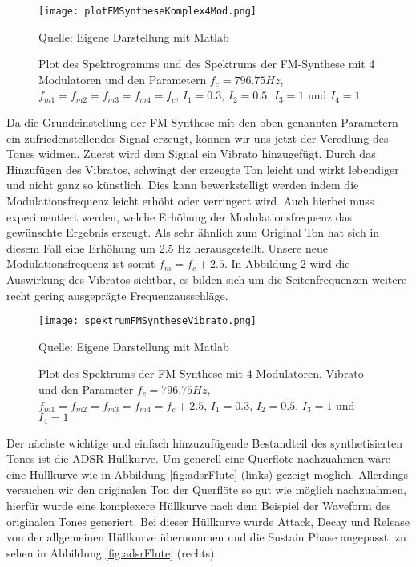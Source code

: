 \begin{figure} [ht]
\centering
  \texttt{[image: plotFMSyntheseKomplex4Mod.png]}
\caption{Plot des Spektrogramms und des Spektrums der FM-Synthese mit 4 Modulatoren und den Parametern $f_c = 796.75 Hz$, $f_{m1} = f_{m2} = f_{m3} = f_{m4} = f_c$, $I_1 = 0.3$, $I_2 = 0.5$, $I_3 = 1$ und $I_4 = 1$}
\label{fig:plotFMSyntheseKomplex4Mod}
Quelle: Eigene Darstellung mit Matlab
\end{figure}

Da die Grundeinstellung der FM-Synthese mit den oben genannten Parametern ein zufriedenstellendes Signal erzeugt, können wir uns jetzt der Veredlung des Tones widmen. Zuerst wird dem Signal ein Vibrato hinzugefügt. Durch das Hinzufügen des Vibratos, schwingt der erzeugte Ton leicht und wirkt lebendiger und nicht ganz so künstlich. Dies kann bewerkstelligt werden indem die Modulationsfrequenz leicht erhöht oder verringert wird. Auch hierbei muss experimentiert werden, welche Erhöhung der Modulationsfrequenz das gewünschte Ergebnis erzeugt. Als sehr ähnlich zum Original Ton hat sich in diesem Fall eine Erhöhung um 2.5 Hz herausgestellt. Unsere neue Modulationsfrequenz ist somit $f_m = f_c + 2.5$. In Abbildung \ref{fig:spektrumFMSyntheseVibrato} wird die Auswirkung des Vibratos sichtbar, es bilden sich um die Seitenfrequenzen weitere recht gering ausgeprägte Frequenzausschläge.

\begin{figure} [ht]
\centering
  \texttt{[image: spektrumFMSyntheseVibrato.png]}
\caption{Plot des Spektrums der FM-Synthese mit 4 Modulatoren, Vibrato und den Parameter $f_c = 796.75 Hz$, $f_{m1} = f_{m2} = f_{m3} = f_{m4} = f_c + 2.5$, $I_1 = 0.3$, $I_2 = 0.5$, $I_3 = 1$ und $I_4 = 1$}
\label{fig:spektrumFMSyntheseVibrato}
Quelle: Eigene Darstellung mit Matlab
\end{figure}

Der nächste wichtige und einfach hinzuzufügende Bestandteil des synthetisierten Tones ist die ADSR-Hüllkurve. Um generell eine Querflöte nachzuahmen wäre eine Hüllkurve wie in Abbildung \ref{fig:adsrFlute} (links) gezeigt möglich. Allerdings versuchen wir den originalen Ton der Querflöte so gut wie möglich nachzuahmen, hierfür wurde eine komplexere Hüllkurve nach dem Beispiel der Waveform des originalen Tones generiert. Bei dieser Hüllkurve wurde Attack, Decay und Release von der allgemeinen Hüllkurve übernommen und die Sustain Phase angepasst, zu sehen in Abbildung \ref{fig:adsrFlute} (rechts). 


